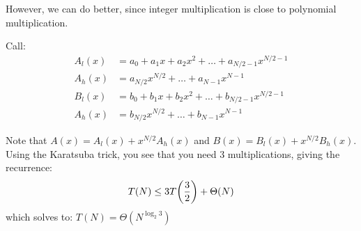 However, we can do better, since integer multiplication is close to polynomial multiplication.

\begin{algothm} 
    Call:
    \begin{align*}
        A_l(x) &= a_0 + a_1 x + a_2 x^2 + \dots + a_{N/2 - 1}x^{N/2 - 1} \\
        A_h(x) &= a_{N/2} x^{N/2} + \dots + a_{N-1}x^{N - 1} \\
        B_l(x) &= b_0 + b_1 x + b_2 x^2 + \dots + b_{N/2 - 1}x^{N/2 - 1} \\
        A_h(x) &= b_{N/2} x^{N/2} + \dots + b_{N-1}x^{N - 1} 
    \end{align*}

    Note that $A(x) = A_l(x) + x^{N/2} A_h(x)$ and $B(x) = B_l(x) +  x^{N/2} B_h(x)$. Using the Karatsuba trick,
    you see that you need 3 multiplications, giving the recurrence:
    \[ T(N) \leq 3 T\qty(\frac{3}{2}) + \Theta(N) \]
    which solves to: $T(N) = \Theta(N^{\log_2{3}})$
\end{algothm}

